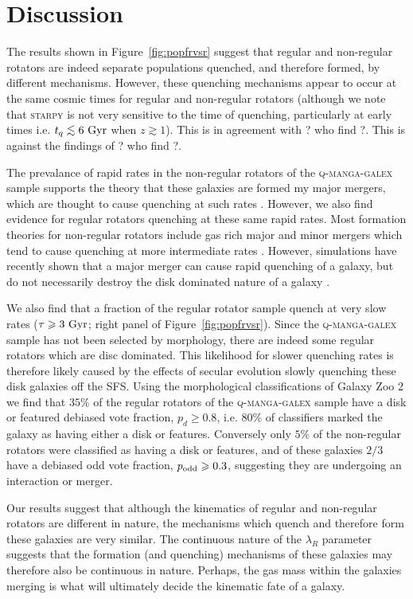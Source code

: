 \documentclass[useAMS,usenatbib]{mn2e}
\def\lesssim{\mathrel{\hbox{\rlap{\hbox{\lower3pt\hbox{$\sim$}}}\hbox{\raise2pt\hbox{$<$}}}}}
\begin{document}
\section{Discussion}\label{sec:discussion}

The results shown in Figure~\ref{fig:popfrvsr} suggest that regular and non-regular rotators are indeed separate populations quenched, and therefore formed, by different mechanisms. However, these quenching mechanisms appear to occur at the same cosmic times for regular and non-regular rotators (although we note that \textsc{starpy} is not very sensitive to the time of quenching, particularly at early times i.e. $t_q \lesssim 6~\rm{Gyr}$ when $z \gtrsim 1$). This is in agreement with ? who find ?. This is against the findings of ? who find ?. 

The prevalance of rapid rates in the non-regular rotators of the \textsc{q-manga-galex} sample supports the theory that these galaxies are formed my major mergers, which are thought to cause quenching at such rates \cite{?,?,smethurst15}. However, we also find evidence for regular rotators quenching at these same rapid rates. Most formation theories for non-regular rotators include gas rich major and minor mergers which tend to cause quenching at more intermediate rates \citep{?,?, smethurst17}. However, simulations have recently shown that a major merger can cause rapid quenching of a galaxy, but do not necessarily destroy the disk dominated nature of a galaxy \citep{pontzen16, sparre16}.

We also find that a fraction of the regular rotator sample quench at very slow rates ($\tau \geq 3~\rm{Gyr}$; right panel of Figure~\ref{fig:popfrvsr}). Since the \textsc{q-manga-galex} sample has not been selected by morphology, there are indeed some regular rotators which are disc dominated. This likelihood for slower quenching rates is therefore likely caused by the effects of secular evolution slowly quenching these disk galaxies off the SFS. Using the morphological classifications of Galaxy Zoo 2 \citep{lintott11, GZ2} we find that $35\%$ of the regular rotators of the \textsc{q-manga-galex} sample have a disk or featured debiased vote fraction, $p_d \geq 0.8$, i.e. $80\%$ of classifiers marked the galaxy as having either a disk or features. Conversely only $5\%$ of the non-regular rotators were classified as having a disk or features, and of these galaxies $2/3$ have a debiased odd vote fraction, $p_{\rm{odd}} \geq 0.3$, suggesting they are undergoing an interaction or merger.  

Our results suggest that although the kinematics of regular and non-regular rotators are different in nature, the mechanisms which quench and therefore form these galaxies are very similar. The continuous nature of the $\lambda_R$ parameter suggests that the formation (and quenching) mechanisms of these galaxies may therefore also be continuous in nature. Perhaps, the gas mass within the galaxies merging is what will ultimately decide the kinematic fate of a galaxy. 


  
\end{document}
